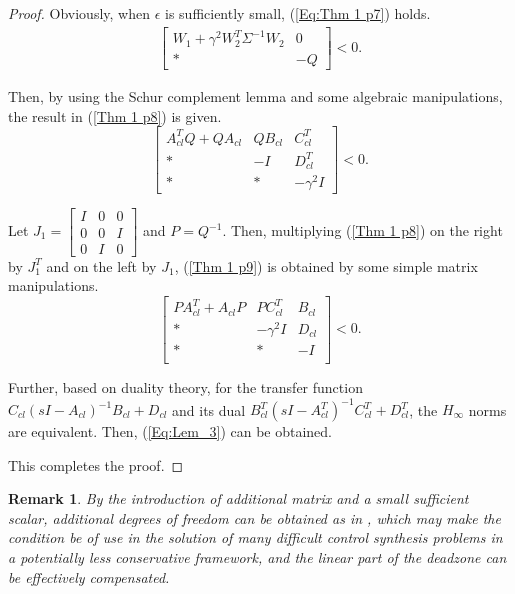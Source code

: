 \documentclass[journal,onecolumn]{IEEEtran}
\newtheorem{rem}{Remark}
\begin{document}
\begin{proof}
Obviously, when $\epsilon$ is sufficiently small, (\ref{Eq:Thm 1
p7}) holds.
\begin{equation}\label{Eq:Thm 1 p7}\begin{array}{l}\left[\begin{array}{cc}W_1+\gamma^2W_2^T\Sigma^{-1}W_2&
0\\
* &
-Q\end{array}\right]<0.
\end{array}
\end{equation}

Then,  by using the Schur complement lemma and some algebraic
manipulations,  the result in (\ref{Thm 1 p8}) is given.
\begin{equation}\label{Thm 1 p8}\left[\begin{array}{cccc} A_{cl}^TQ+ QA_{cl}&
 QB_{cl}&C_{cl}^T\\
 * &-I& D_{cl}^T\\ * & * &-\gamma^2 I\end{array}\right]<0.
\end{equation}

Let $J_1=\left[\begin{array}{cccc}
I&0&0\\0&0&I\\0&I&0\end{array}\right]$ and $P=Q^{-1}$. Then,
multiplying (\ref{Thm 1 p8}) on the right by $J_1^T$ and on the left
by $J_1$, (\ref{Thm 1 p9}) is obtained by some simple matrix
manipulations.
\begin{equation}\label{Thm 1 p9}\left[
\begin{array}{cccc}
PA_{cl}^T+A_{cl}P&PC_{cl}^T&B_{cl}\\
{*}&-\gamma^2I&D_{cl}\\
{*}&{*}&-I\\

\end{array}\right]<0.
\end{equation}

Further, based on duality theory, for the transfer function
$C_{cl}(s I-A_{cl})^{-1}B_{cl}+D_{cl}$ and its dual $B_{cl}^T(s
I-A_{cl}^T)^{-1}C_{cl}^T+D_{cl}^T$, the $H_{\infty}$ norms are
equivalent. Then, (\ref{Eq:Lem_3}) can be obtained.

This completes the proof.
 \end{proof}


\begin{rem}\label{re3}
By the introduction of additional matrix and a small sufficient
scalar, additional degrees of freedom can be obtained as in
\cite{JiaYM}, which may make the condition be of use in the solution
of many difficult control synthesis problems in a potentially less
conservative framework, and the linear part of the deadzone can be
effectively compensated.
\end{rem}
\end{document}
